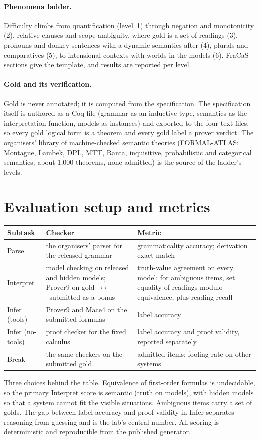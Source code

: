 \documentclass[10pt,a4paper]{article}
\begin{document}
\paragraph{Phenomena ladder.} Difficulty climbs from quantification (level~1) through negation and monotonicity (2), relative clauses and scope ambiguity, where gold is a set of readings (3), pronouns and donkey sentences with a dynamic semantics after \citet{groenendijk1991} (4), plurals and comparatives (5), to intensional contexts with worlds in the models (6). FraCaS sections give the template, and results are reported per level.

\paragraph{Gold and its verification.} Gold is never annotated; it is computed from the specification. The specification itself is authored as a Coq file (grammar as an inductive type, semantics as the interpretation function, models as instances) and exported to the four text files, so every gold logical form is a theorem and every gold label a prover verdict. The organisers' library of machine-checked semantic theories (FORMAL-ATLAS: Montague, Lambek, DPL, MTT, Ranta, inquisitive, probabilistic and categorical semantics; about 1,000 theorems, none admitted) is the source of the ladder's levels.

\section{Evaluation setup and metrics}
\begin{center}\small
\begin{tabular}{@{}p{2.6cm}p{6.2cm}p{6.2cm}@{}}
\toprule
Subtask & Checker & Metric \\
\midrule
Parse & the organisers' parser for the released grammar & grammaticality accuracy; derivation exact match \\
Interpret & model checking on released and hidden models; Prover9 on gold~$\leftrightarrow$~submitted as a bonus & truth-value agreement on every model; for ambiguous items, set equality of readings modulo equivalence, plus reading recall \\
Infer (tools) & Prover9 and Mace4 on the submitted formulas & label accuracy \\
Infer (no-tools) & proof checker for the fixed calculus & label accuracy and proof validity, reported separately \\
Break & the same checkers on the submitted gold & admitted items; fooling rate on other systems \\
\bottomrule
\end{tabular}
\end{center}
Three choices behind the table. Equivalence of first-order formulas is undecidable, so the primary Interpret score is semantic (truth on models), with hidden models so that a system cannot fit the visible situations. Ambiguous items carry a set of golds. The gap between label accuracy and proof validity in Infer separates reasoning from guessing and is the lab's central number. All scoring is deterministic and reproducible from the published generator.
\end{document}

